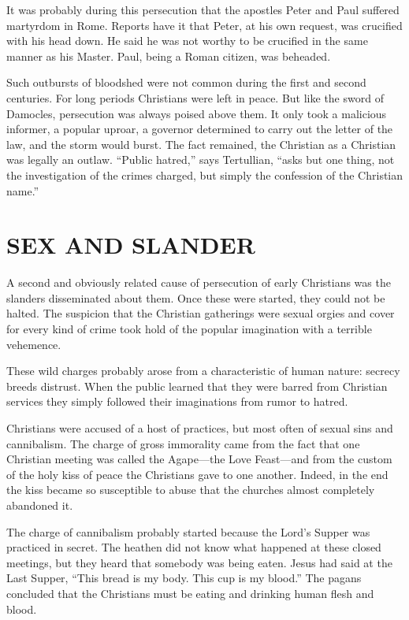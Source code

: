 It was probably during this persecution that the apostles Peter and Paul suffered martyrdom in Rome.
Reports have it that Peter, at his own request, was crucified with his head down. He said he was not
worthy to be crucified in the same manner as his Master. Paul, being a Roman citizen, was beheaded.

Such outbursts of bloodshed were not common during the first and second centuries. For long periods
Christians were left in peace. But like the sword of Damocles, persecution was always poised above
them. It only took a malicious informer, a popular uproar, a governor determined to carry out the
letter of the law, and the storm would burst. The fact remained, the Christian as a Christian was
legally an outlaw. “Public hatred,” says Tertullian, “asks but one thing, not the investigation of
the crimes charged, but simply the confession of the Christian name.”

\section{SEX AND SLANDER}

A second and obviously related cause of persecution of early Christians was the slanders
disseminated about them. Once these were started, they could not be halted. The suspicion that the
Christian gatherings were sexual orgies and cover for every kind of crime took hold of the popular
imagination with a terrible vehemence.

These wild charges probably arose from a characteristic of human nature: secrecy breeds distrust.
When the public learned that they were barred from Christian services they simply followed their
imaginations from rumor to hatred.

Christians were accused of a host of practices, but most often of sexual sins and cannibalism. The
charge of gross immorality came from the fact that one Christian meeting was called the Agape—the
Love Feast—and from the custom of the holy kiss of peace the Christians gave to one another. Indeed,
in the end the kiss became so susceptible to abuse that the churches almost completely abandoned it.

The charge of cannibalism probably started because the Lord’s Supper was practiced in secret. The
heathen did not know what happened at these closed meetings, but they heard that somebody was being
eaten. Jesus had said at the Last Supper, “This bread is my body. This cup is my blood.” The pagans
concluded that the Christians must be eating and drinking human flesh and blood.

